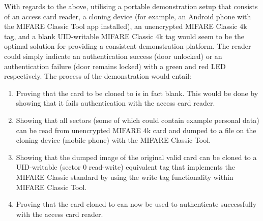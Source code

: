 With regards to the above, utilising a portable demonstration setup that consists of an access card reader, a cloning device (for example, an Android phone with the MIFARE Classic Tool app installed), an unencrypted MIFARE Classic 4k tag, and a blank UID-writable MIFARE Classic 4k tag would seem to be the optimal solution for providing a consistent demonstration platform. The reader could simply indicate an authentication success (door unlocked) or an authentication failure (door remains locked) with a green and red LED respectively. The process of the demonstration would entail:

\begin{enumerate}
  \item Proving that the card to be cloned to is in fact blank. This would be done by showing that it fails authentication with the access card reader.
  \item Showing that all sectors (some of which could contain example personal data) can be read from unencrypted MIFARE 4k card and dumped to a file on the cloning device (mobile phone) with the MIFARE Classic Tool.
  \item Showing that the dumped image of the original valid card can be cloned to a UID-writable (sector 0 read-write) equivalent tag that implements the MIFARE Classic standard by using the write tag functionality within MIFARE Classic Tool.
  \item Proving that the card cloned to can now be used to authenticate successfully with the access card reader.
\end{enumerate}
